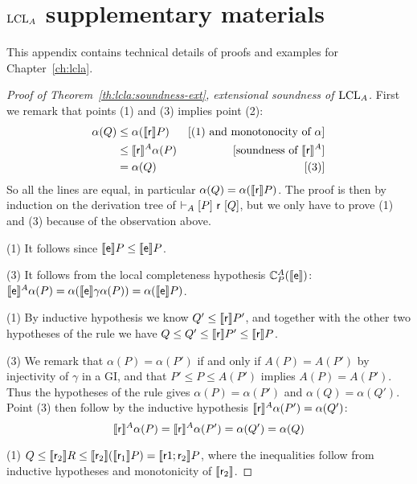 
\chapter{\texorpdfstring{$\text{LCL}_A$}{LCL} supplementary materials}\label{ch:app:lcla}
This appendix contains technical details of proofs and examples for Chapter~\ref{ch:lcla}.

\begin{proof}[Proof of Theorem~\ref{th:lcla:soundness-ext}, extensional soundness of $\text{LCL}_A$]
	First we remark that points (1) and (3) implies point (2):
	\begin{align*}
		\alpha(Q) & \le \alpha(\llbracket\mathsf{r}\rrbracket P)     & [\text{(1) and monotonocity of }\alpha] \\
		          & \le \llbracket\mathsf{r}\rrbracket^{A} \alpha(P) & [\text{soundness of }\llbracket\mathsf{r}\rrbracket^{A}] \\
		          & = \alpha(Q)                     & [\text{(3)}]
	\end{align*}
	So all the lines are equal, in particular $\alpha(Q) = \alpha(\llbracket\mathsf{r}\rrbracket P)$.
	The proof is then by induction on the derivation tree of $\vdash_{A}\nobreak[P]~\mathsf{r}~[Q]$, but we only have to prove (1) and (3) because of the observation above.

	\noindent (1) It follows since $\llbracket\mathsf{e}\rrbracket P \le \llbracket\mathsf{e}\rrbracket P$.

	\noindent (3) It follows from the local completeness hypothesis $\mathbb{C}^{A}_{P}(\llbracket\mathsf{e}\rrbracket)$: $\llbracket\mathsf{e}\rrbracket^{A} \alpha(P) = \alpha(\llbracket\mathsf{e}\rrbracket \gamma \alpha(P)) = \alpha(\llbracket\mathsf{e}\rrbracket P)$.

	\noindent (1) By inductive hypothesis we know $Q' \le \llbracket\mathsf{r}\rrbracket P'$, and together with the other two hypotheses of the rule we have $Q \le Q' \le \llbracket\mathsf{r}\rrbracket P' \le \llbracket\mathsf{r}\rrbracket P$.

	\noindent (3) We remark that $\alpha(P) = \alpha(P')$ if and only if $A(P) = A(P')$ by injectivity of $\gamma$ in a GI, and that $P' \le P \le A(P')$ implies $A(P) = A(P')$. Thus the hypotheses of the rule gives $\alpha(P) = \alpha(P')$ and $\alpha(Q) = \alpha(Q')$. Point (3) then follow by the inductive hypothesis $\llbracket\mathsf{r}\rrbracket^{A} \alpha(P') = \alpha(Q')$:
	\[
	\llbracket\mathsf{r}\rrbracket^{A} \alpha(P) = \llbracket\mathsf{r}\rrbracket^{A} \alpha(P') = \alpha(Q') = \alpha(Q)
	\]

	 (1) $Q \le \llbracket\mathsf{r}_2\rrbracket R \le \llbracket\mathsf{r}_2\rrbracket (\llbracket\mathsf{r}_1\rrbracket P) = \llbracket\mathsf{r}1; \mathsf{r}_2\rrbracket P$, where the inequalities follow from inductive hypotheses and monotonicity of $\llbracket\mathsf{r}_2\rrbracket$.


\end{proof}
